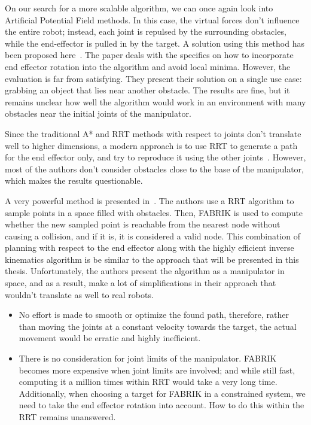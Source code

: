 On our search for a more scalable algorithm, we can once again look into Artificial Potential Field methods. In this case, the virtual forces don't influence the entire robot; instead, each joint is repulsed by the surrounding obstacles, while the end-effector is pulled in by the target. A solution using this method has been proposed here~\cite{aapf}. The paper deals with the specifics on how to incorporate end effector rotation into the algorithm and avoid local minima. However, the evaluation is far from satisfying. They present their solution on a single use case: grabbing an object that lies near another obstacle. The results are fine, but it remains unclear how well the algorithm would work in an environment with many obstacles near the initial joints of the manipulator.

Since the traditional A* and RRT methods with respect to joints don't translate well to higher dimensions, a modern approach is to use RRT to generate a path for the end effector only, and try to reproduce it using the other joints~\cite{RRT_manipulator, rrt_industrial}. However, most of the authors don't consider obstacles close to the base of the manipulator, which makes the results questionable.

A very powerful method is presented in~\cite{rrt_fabrik}. The authors use a RRT algorithm to sample points in a space filled with obstacles. Then, FABRIK is used to compute whether the new sampled point is reachable from the nearest node without causing a collision, and if it is, it is considered a valid node. This combination of planning with respect to the end effector along with the highly efficient inverse kinematics algorithm is be similar to the approach that will be presented in this thesis. Unfortunately, the authors present the algorithm as a manipulator in space, and as a result, make a lot of simplifications in their approach that wouldn't translate as well to real robots.

\begin{itemize}
  \item No effort is made to smooth or optimize the found path, therefore, rather than moving the joints at a constant velocity towards the target, the actual movement would be erratic and highly inefficient.

  \item There is no consideration for joint limits of the manipulator. FABRIK becomes more expensive when joint limits are involved; and while still fast, computing it a million times within RRT would take a very long time. Additionally, when choosing a target for FABRIK in a constrained system, we need to take the end effector rotation into account. How to do this within the RRT remains unanswered.
\end{itemize}
